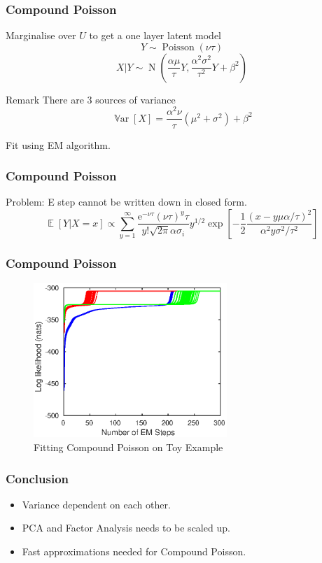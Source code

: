 \documentclass{beamer}
\DeclareMathOperator{\expectation}{\mathbb{E}}
\DeclareMathOperator{\variance}{\mathbb{V}ar}
\DeclareMathOperator{\normal}{N}
\DeclareMathOperator{\poisson}{Poisson}
\newcommand{\euler}{\mathrm{e}}
\begin{document}
\begin{frame}
\frametitle{Compound Poisson}
Marginalise over $U$ to get a one layer latent model
\begin{equation}
Y\sim\poisson(\nu\tau)
\end{equation}
\begin{equation}
X|Y\sim\normal\left(
\frac{\alpha\mu}{\tau}Y,\frac{\alpha^2\sigma^2}{\tau^2}Y+\beta^2
\right)
\end{equation}
\begin{block}{Remark}
There are 3 sources of variance
\begin{equation}
\variance[X] = \frac{\alpha^2\nu}{\tau}\left(\mu^2+\sigma^2\right)+\beta^2
\end{equation}
\end{block}
Fit using EM algorithm.
\end{frame}

\begin{frame}
\frametitle{Compound Poisson}
Problem: E step cannot be written down in closed form.
\begin{equation}
\expectation\left[Y|X=x\right]\propto
\sum_{y=1}^{\infty}\dfrac{\euler^{-\nu\tau}(\nu\tau)^{y}\tau}{y!\sqrt{2\pi}\alpha\sigma_i}y^{1/2}
\exp\left[-\dfrac{1}{2}\dfrac{\left(x-y\mu\alpha/\tau\right)^2}{\alpha^2y\sigma^2/\tau^2}\right]
\end{equation}
\end{frame}

\begin{frame}
\frametitle{Compound Poisson}
\begin{figure}
	\includegraphics[width=0.65\textwidth]{figures/hierarchicalModel/EM_initial_lnL.eps}
	\caption{Fitting Compound Poisson on Toy Example}
\end{figure}
\end{frame}

\begin{frame}
\frametitle{Conclusion}
\begin{itemize}
	\item Variance dependent on each other.
	\item PCA and Factor Analysis needs to be scaled up.
	\item Fast approximations needed for Compound Poisson.
\end{itemize}
\end{frame}
\end{document}
